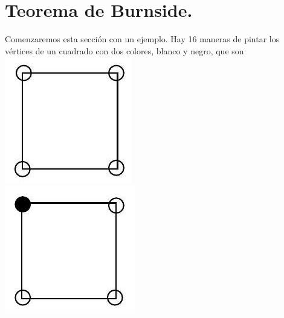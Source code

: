 \documentclass[10pt]{article}
\begin{document}
\section*{Teorema de Burnside.}
Comenzaremos esta sección con un ejemplo. Hay 16 maneras de pintar los vértices de un cuadrado con dos colores, blanco y negro, que son\\
\includegraphics[max width=\textwidth, center]{2025_09_05_3ba26226ec0baddb5a03g-50(10)}\\
\includegraphics[max width=\textwidth, center]{2025_09_05_3ba26226ec0baddb5a03g-50(4)}\\
\end{document}
